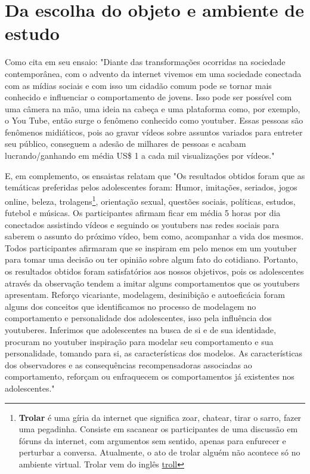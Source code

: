 \section{Da escolha do objeto e ambiente de estudo}

Como cita  em seu ensaio: "Diante das transformações ocorridas na sociedade contemporânea, com o advento da internet vivemos em uma sociedade conectada com as mídias sociais e com isso um cidadão comum pode se tornar mais conhecido e influenciar o comportamento de jovens. Isso pode ser possível com uma câmera na mão, uma ideia na cabeça e uma plataforma como, por exemplo, o You Tube, então surge o fenômeno conhecido como youtuber. Essas pessoas são fenômenos midiáticos, pois ao gravar vídeos sobre assuntos variados para entreter seu público, conseguem a adesão de milhares de pessoas e acabam lucrando/ganhando em média US\$ 1 a cada mil visualizações por vídeos."

E, em complemento, os ensaistas relatam que "Os resultados obtidos foram que as temáticas preferidas pelos adolescentes foram: Humor, imitações, seriados, jogos online, beleza, trolagens\footnote{\textbf{Trolar} é uma gíria da internet que significa zoar, chatear, tirar o sarro, fazer uma pegadinha. Consiste em sacanear os participantes de uma discussão em fóruns da internet, com argumentos sem sentido, apenas para enfurecer e perturbar a conversa. Atualmente, o ato de trolar alguém não acontece só no ambiente virtual. Trolar vem do inglês \href{https://www.oxfordlearnersdictionaries.com/definition/english/troll_2}{troll} }, orientação sexual, questões sociais, políticas, estudos, futebol e músicas. Os participantes afirmam ficar em média 5 horas por dia conectados assistindo vídeos e seguindo os youtubers nas redes sociais para saberem o assunto do próximo vídeo, bem como, acompanhar a vida dos mesmos. Todos participantes afirmaram que se inspiram em pelo menos em um youtuber para tomar uma decisão ou ter opinião sobre algum fato do cotidiano. Portanto, os resultados obtidos foram satisfatórios aos nossos objetivos, pois os adolescentes através da observação tendem a imitar alguns comportamentos que os youtubers apresentam. Reforço vicariante, modelagem, desinibição e autoeficácia foram alguns dos conceitos que identificamos no processo de modelagem no comportamento e personalidade dos adolescentes, isso pela influência dos youtuberes. Inferimos que adolescentes na busca de si e de sua identidade, procuram no youtuber inspiração para modelar seu comportamento e sua personalidade, tomando para si, as características dos modelos. As características dos observadores e as consequências recompensadoras associadas ao comportamento, reforçam ou enfraquecem os comportamentos já existentes nos adolescentes."

